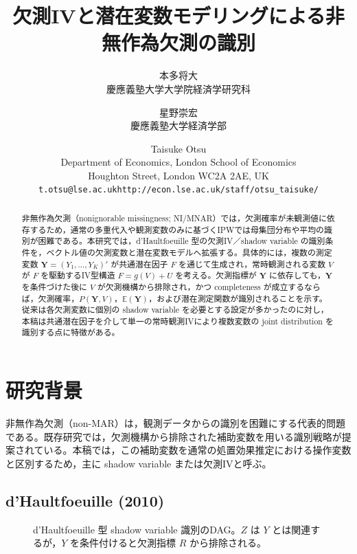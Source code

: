 \documentclass[dvipdfmx,autodetect-engine]{jsarticle}
\title{欠測IVと潜在変数モデリングによる非無作為欠測の識別}
\author{%
本多将大\\[-1mm]
\small 慶應義塾大学大学院経済学研究科
\and
星野崇宏\\[-1mm]
\small 慶應義塾大学経済学部
\and
Taisuke Otsu\\[-1mm]
\small Department of Economics, London School of Economics\\[-1mm]
\small Houghton Street, London WC2A 2AE, UK\\[-1mm]
\small \texttt{t.otsu@lse.ac.uk}\quad \texttt{http://econ.lse.ac.uk/staff/otsu\_taisuke/}
}
\date{}
\newcommand{\indep}{\mathrel{\perp\!\!\!\perp}}
\newcommand{\E}{\mathbb{E}}
\newcommand{\1}{\mathbf{1}}
\newcommand{\Y}{\bm{Y}}
\begin{document}
\maketitle

\begin{abstract}
非無作為欠測（nonignorable missingness; NI/MNAR）では，欠測確率が未観測値に依存するため，通常の多重代入や観測変数のみに基づくIPWでは母集団分布や平均の識別が困難である。本研究では，d'Haultfoeuille 型の欠測IV／shadow variable の識別条件を，ベクトル値の欠測変数と潜在変数モデルへ拡張する。具体的には，複数の測定変数 $\Y=(Y_1,\ldots,Y_K)'$ が共通潜在因子 $F$ を通じて生成され，常時観測される変数 $V$ が $F$ を駆動するIV型構造 $F=g(V)+U$ を考える。欠測指標が $\Y$ に依存しても，$\Y$ を条件づけた後に $V$ が欠測機構から排除され，かつ completeness が成立するならば，欠測確率，$P(\Y,V)$，$\E(\Y)$，および潜在測定関数が識別されることを示す。従来は各欠測変数に個別の shadow variable を必要とする設定が多かったのに対し，本稿は共通潜在因子を介して単一の常時観測IVにより複数変数の joint distribution を識別する点に特徴がある。
\end{abstract}

\section{研究背景}
非無作為欠測（non-MAR）は，観測データからの識別を困難にする代表的問題である。既存研究では，欠測機構から排除された補助変数を用いる識別戦略が提案されている。本稿では，この補助変数を通常の処置効果推定における操作変数と区別するため，主に shadow variable または欠測IVと呼ぶ。

\subsection{d'Haultfoeuille (2010)}

\begin{figure}[tbp]
\centering
{}
\caption{d'Haultfoeuille 型 shadow variable 識別のDAG。$Z$ は $Y$ とは関連するが，$Y$ を条件付けると欠測指標 $R$ から排除される。}
\label{fig:dag-dhaultfoeuille}
\end{figure}
\end{document}

